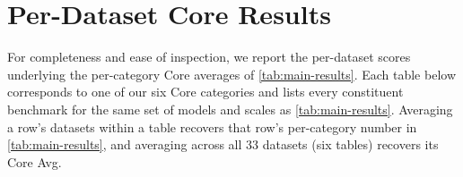 \section{Per-Dataset Core Results}\label{app:per-dataset-evals}

For completeness and ease of inspection, we report the per-dataset scores underlying the per-category Core averages of \cref{tab:main-results}. Each table below corresponds to one of our six Core categories and lists every constituent benchmark for the same set of models and scales as \cref{tab:main-results}. Averaging a row's datasets within a table recovers that row's per-category number in \cref{tab:main-results}, and averaging across all 33 datasets (six tables) recovers its Core Avg. 








